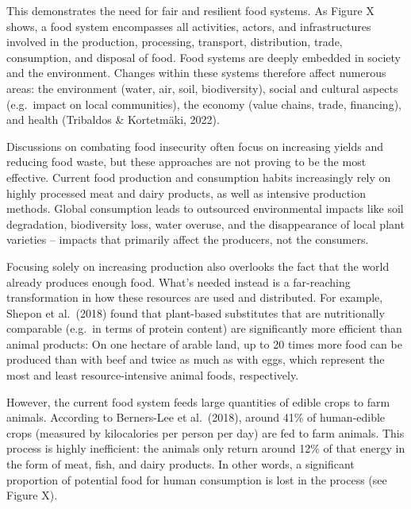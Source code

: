 \documentclass[
  a4paper,
  openany]{book}
\begin{document}
This demonstrates the need for fair and resilient food systems. As
Figure X shows, a food system encompasses all activities, actors, and
infrastructures involved in the production, processing, transport,
distribution, trade, consumption, and disposal of food. Food systems are
deeply embedded in society and the environment. Changes within these
systems therefore affect numerous areas: the environment (water, air,
soil, biodiversity), social and cultural aspects (e.g.~impact on local
communities), the economy (value chains, trade, financing), and health
(Tribaldos \& Kortetmäki, 2022).

Discussions on combating food insecurity often focus on increasing
yields and reducing food waste, but these approaches are not proving to
be the most effective. Current food production and consumption habits
increasingly rely on highly processed meat and dairy products, as well
as intensive production methods. Global consumption leads to outsourced
environmental impacts like soil degradation, biodiversity loss, water
overuse, and the disappearance of local plant varieties -- impacts that
primarily affect the producers, not the consumers.

Focusing solely on increasing production also overlooks the fact that
the world already produces enough food. What's needed instead is a
far-reaching transformation in how these resources are used and
distributed. For example, Shepon et al.~(2018) found that plant-based
substitutes that are nutritionally comparable (e.g.~in terms of protein
content) are significantly more efficient than animal products: On one
hectare of arable land, up to 20 times more food can be produced than
with beef and twice as much as with eggs, which represent the most and
least resource-intensive animal foods, respectively.

However, the current food system feeds large quantities of edible crops
to farm animals. According to Berners-Lee et al.~(2018), around 41\% of
human-edible crops (measured by kilocalories per person per day) are fed
to farm animals. This process is highly inefficient: the animals only
return around 12\% of that energy in the form of meat, fish, and dairy
products. In other words, a significant proportion of potential food for
human consumption is lost in the process (see Figure X).
\end{document}
